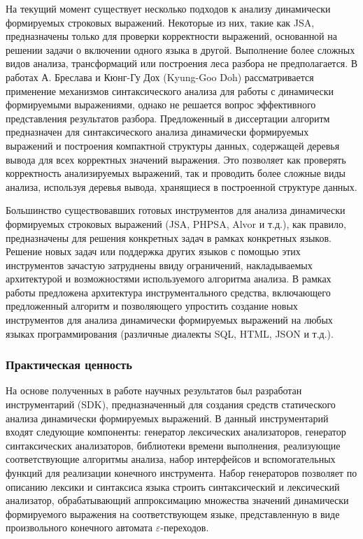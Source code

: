 На текущий момент существует несколько подходов к анализу динамически формируемых строковых выражений. Некоторые из них, такие как JSA, предназначены только для проверки корректности выражений, основанной на решении задачи о включении одного языка в другой. Выполнение более сложных видов анализа, трансформаций или построения леса разбора не предполагается. В работах А. Бреслава и Кюнг-Гу Дох (Kyung-Goo Doh) рассматривается применение механизмов синтаксического анализа для работы с динамически формируемыми выражениями, однако не решается вопрос эффективного представления результатов разбора. Предложенный в диссертации алгоритм предназначен для синтаксического анализа динамически формируемых выражений и построения компактной структуры данных, содержащей деревья вывода для всех корректных значений выражения. Это позволяет как проверять корректность анализируемых выражений, так и проводить более сложные виды анализа, используя деревья вывода, хранящиеся в построенной структуре данных.

Большинство существовавших готовых инструментов для анализа динамически формируемых строковых выражений (JSA, PHPSA, Alvor и т.д.), как правило, предназначены для решения конкретных задач в рамках конкретных языков. Решение новых задач или поддержка других языков с помощью этих инструментов зачастую затруднены ввиду ограничений, накладываемых архитектурой и возможностями используемого алгоритма анализа. В рамках работы предложена архитектура инструментального средства, включающего предложенный алгоритм и позволяющего упростить создание новых инструментов для анализа динамически формируемых выражений на любых языках программирования (различные диалекты SQL, HTML, JSON и т.д.).

\subsubsection*{\large{Практическая ценность}}

На основе полученных в работе научных результатов был разработан инструментарий (SDK), предназначенный для создания средств статического анализа динамически формируемых выражений. В данный инструментарий входят следующие компоненты: генератор лексических анализаторов, генератор синтаксических анализаторов, библиотеки времени выполнения, реализующие соответствующие алгоритмы анализа, набор интерфейсов и вспомогательных функций для реализации конечного инструмента. Набор генераторов позволяет по описанию лексики и синтаксиса языка строить синтаксический и лексический анализатор, обрабатывающий аппроксимацию множества значений динамически формируемого выражения на соответствующем языке, представленную в виде произвольного конечного автомата $\varepsilon$-переходов.

